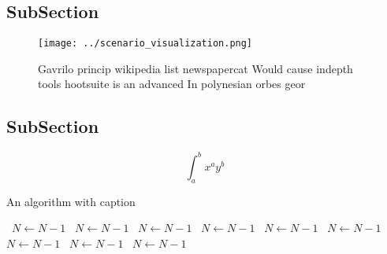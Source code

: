 \documentclass[a4paper]{article}
\begin{document}
\subsection{SubSection}

\begin{figure}
\centering
\texttt{[image: ../scenario\_visualization.png]}
\caption{Gavrilo princip wikipedia list newspapercat Would cause indepth tools hootsuite is an advanced In polynesian orbes geor
}
\end{figure}
 
\subsection{SubSection}

\[ \int_{a}^{b}{x^{a}y^{b}} \]

\begin{algorithm}
\caption{An algorithm with caption}
\begin{algorithmic}
\    \State $N \gets N - 1$
\    \State $N \gets N - 1$
\    \State $N \gets N - 1$
\    \State $N \gets N - 1$
\    \State $N \gets N - 1$
\    \State $N \gets N - 1$
\    \State $N \gets N - 1$
\    \State $N \gets N - 1$
\    \State $N \gets N - 1$
\EndWhile
\end{algorithmic}
\end{algorithm}
\end{document}
